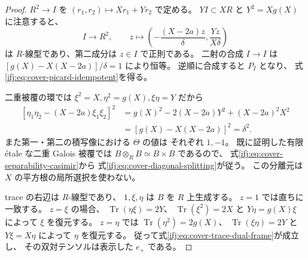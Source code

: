\begin{proof}
$R^2\to I$ を $(r_1,r_2)\mapsto Xr_1+Yr_2$ で定める。
$YI\subset XR$ と $Y^2=Xg(X)$ に注意すると、
\[
 I\longrightarrow R^2,\qquad
 z\longmapsto
   \left(-\frac{(X-2a)z}{\delta},
                \frac{Yz}{X\delta}\right)
\]
は $R$-線型であり、第二成分は $z\in I$ で正則である。
二射の合成 $I\to I$ は
$[g(X)-X(X-2a)]/\delta=1$ により恒等。
逆順に合成すると $P_I$ となり、
式\eqref{ifj:eq:cover-picard-idempotent}を得る。

二重被覆の環では
$\xi^2=X,\eta^2=g(X),\xi\eta=Y$ だから
\[
 \begin{split}
 [\eta_1\eta_2-(X-2a)\xi_1\xi_2]^2
 &=g(X)^2-2(X-2a)Y^2+(X-2a)^2X^2\\
 &=[g(X)-X(X-2a)]^2=\delta^2.
 \end{split}
\]
また第一・第二の積写像における $\Theta$ の値は
それぞれ $1,-1$。
既に証明した有限 \'{e}tale な二重 Galois 被覆では
$B\otimes_RB\simeq B\times B$ であるので、
式\eqref{ifj:eq:cover-separability-casimir}から
式\eqref{ifj:eq:cover-diagonal-splitting}が従う。
この分離元は $X$ の平方根の局所選択を使わない。

trace の右辺は $R$-線型であり、
$1,\xi,\eta$ は $B$ を $R$ 上生成する。
$z=1$ では直ちに一致する。
$z=\xi$ の場合、
$\operatorname{Tr}(\eta\xi)=2Y$、
$\operatorname{Tr}(\xi^2)=2X$ と
$Y\eta=g(X)\xi$ によって $\xi$ を復元する。
$z=\eta$ では
$\operatorname{Tr}(\eta^2)=2g(X)$、
$\operatorname{Tr}(\xi\eta)=2Y$ と
$Y\xi=X\eta$ によって $\eta$ を復元する。
従って式\eqref{ifj:eq:cover-trace-dual-frame}が成立し、
その双対テンソルは表示した $e_+$ である。
\end{proof}

